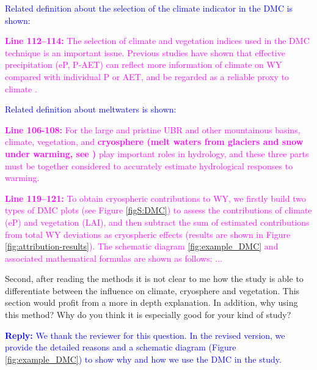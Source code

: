 \documentclass[11pt]{article}
\newcounter{reviewer}
\newcounter{point}[reviewer]
\renewcommand{\thepoint}{Comment\,\thereviewer.\arabic{point}:}
\newcommand{\point}[1]{\refstepcounter{point} \bigskip \noindent {\fontseries{b}\selectfont \thepoint} #1 \par}
\newcommand{\reply}[1]{\bigskip \textcolor{blue}{\noindent \textbf {Reply:} #1}}
\newcommand{\nextreply}[1]{\bigskip \textcolor{blue}{\noindent #1}}
\newcommand{\revised}[3][2]{\bigskip \textcolor{magenta}{\noindent \textbf{Line #2:} #3}}
\begin{document}
\nextreply{Related definition about the selection of the climate indicator in the DMC is shown:}

\revised{112--114}{The selection of climate and vegetation indices used in the DMC technique is an important issue.
Previous studies have shown that effective precipitation (eP, P-AET) can reflect more information of climate on WY compared with individual P or AET, and be regarded as a reliable proxy to climate \citep{wei2010quantifying,zhang2019separating}.}

\nextreply{Related definition about meltwaters is shown:}

\revised{106-108}{For the large and pristine UBR and other mountainous basins, climate, vegetation, and \textbf{cryosphere (melt waters from glaciers and snow under warming, see \citealt{biemans2019importance,huss2018global})} play important roles in hydrology, and these three parts must be together considered to accurately estimate hydrological responses to warming.}

\revised{119--121}{To obtain cryospheric contributions to WY, we firstly build two types of DMC plots (see Figure \ref{figS:DMC}) to assess the contributions of climate (eP) and vegetation (LAI), and then subtract the sum of estimated contributions from total WY deviations as cryospheric effects (results are shown in Figure \ref{fig:attribution-results}). The schematic diagram \ref{fig:example_DMC} and associated mathematical formulas are shown as follows: ...}

\point{Second, after reading the methods it is not clear to me how the study is able to differentiate between the influence on climate, cryosphere and vegetation. This section would profit from a more in depth explanation.
In addition, why using this method?
Why do you think it is especially good for your kind of study?}
\reply{We thank the reviewer for this question. In the revised version, we provide the detailed reasons and a schematic diagram (Figure \ref{fig:example_DMC}) to show why and how we use the DMC in the study.}
\end{document}
